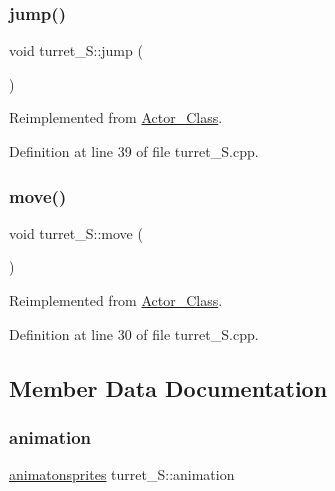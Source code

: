 \subsubsection{\texorpdfstring{jump()}{jump()}}
{\footnotesize\ttfamily void turret\+\_\+\+S\+::jump (\begin{DoxyParamCaption}{ }\end{DoxyParamCaption})\hspace{0.3cm}{\ttfamily [virtual]}}



Reimplemented from \hyperlink{class_actor___class_ab33216a3ce0c856bdc16231c71ae35c2}{Actor\+\_\+\+Class}.



Definition at line 39 of file turret\+\_\+\+S.\+cpp.

\hypertarget{classturret___s_a9ecfd60470958a3bcfbda2f4b751f8ab}{}\label{classturret___s_a9ecfd60470958a3bcfbda2f4b751f8ab} 
\subsubsection{\texorpdfstring{move()}{move()}}
{\footnotesize\ttfamily void turret\+\_\+\+S\+::move (\begin{DoxyParamCaption}{ }\end{DoxyParamCaption})\hspace{0.3cm}{\ttfamily [virtual]}}



Reimplemented from \hyperlink{class_actor___class_af1764a94c5410ba8476f56553cd2c327}{Actor\+\_\+\+Class}.



Definition at line 30 of file turret\+\_\+\+S.\+cpp.



\subsection{Member Data Documentation}
\hypertarget{classturret___s_a3191ef59e26fcf5c901775db480a16a2}{}\label{classturret___s_a3191ef59e26fcf5c901775db480a16a2} 
\subsubsection{\texorpdfstring{animation}{animation}}
{\footnotesize\ttfamily \hyperlink{classanimatonsprites}{animatonsprites} turret\+\_\+\+S\+::animation}



